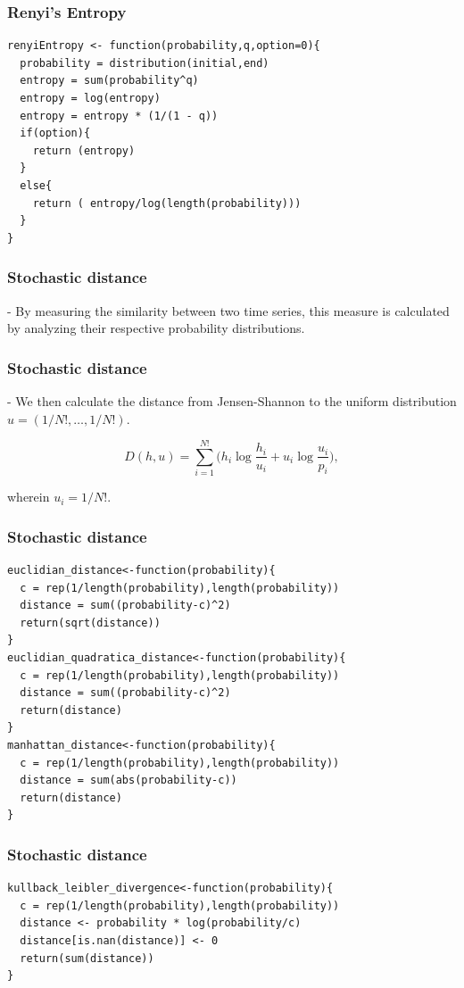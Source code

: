 \documentclass[10pt, compress]{beamer}
\begin{document}
\begin{frame}[fragile]
\frametitle{Renyi's Entropy}
 \begin{lstlisting}
renyiEntropy <- function(probability,q,option=0){
  probability = distribution(initial,end)  
  entropy = sum(probability^q)
  entropy = log(entropy)
  entropy = entropy * (1/(1 - q))
  if(option){
    return (entropy)
  }
  else{
    return ( entropy/log(length(probability)))
  }
}
\end{lstlisting}
\end{frame}
 
\begin{frame}[fragile]
\frametitle{Stochastic distance}

- By measuring the similarity between two time series, this measure is calculated by analyzing their respective probability distributions.

\end{frame}

\begin{frame}[fragile]
\frametitle{Stochastic distance}

- We then calculate the distance from Jensen-Shannon to the uniform distribution $ u=(1/N!,\dots,1/N!)$.

\begin{equation}
D( h, u) = \sum_{i=1}^{N!} \Big(h_i \log\frac{h_i}{u_i} +
u_i \log\frac{u_i}{p_i}
\Big),
\end{equation}

wherein $u_i=1/N!$.
\end{frame}

\begin{frame}[fragile]
\frametitle{Stochastic distance}
 \begin{lstlisting}
euclidian_distance<-function(probability){
  c = rep(1/length(probability),length(probability))
  distance = sum((probability-c)^2)
  return(sqrt(distance))
}
euclidian_quadratica_distance<-function(probability){
  c = rep(1/length(probability),length(probability))
  distance = sum((probability-c)^2)
  return(distance)
}
manhattan_distance<-function(probability){
  c = rep(1/length(probability),length(probability))
  distance = sum(abs(probability-c))
  return(distance)
}
\end{lstlisting}
\end{frame}


\begin{frame}[fragile]
\frametitle{Stochastic distance}
 \begin{lstlisting}
kullback_leibler_divergence<-function(probability){
  c = rep(1/length(probability),length(probability))
  distance <- probability * log(probability/c)
  distance[is.nan(distance)] <- 0
  return(sum(distance))
}
\end{lstlisting}
\end{frame}
\end{document}
